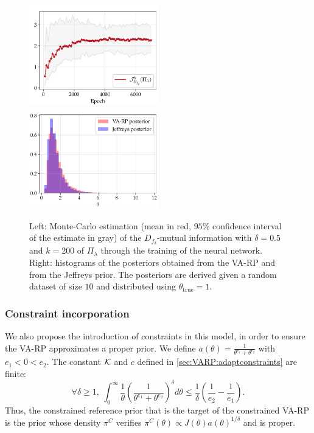 \begin{figure}[h]
    \centering
    \includegraphics[width=5.625cm]{figures/va-rp/MI_normal.pdf}\hspace*{0.2cm}
    \includegraphics[width=5.625cm]{figures/va-rp/normal_post.pdf}
    \caption{Left: Monte-Carlo estimation (mean in red, $95\%$ confidence interval of the estimate in gray) of the $D_{f_\delta}$-mutual information with $\delta=0.5$ and $k=200$ of $\varPi_\lambda$ through the training of the neural network. Right: histograms of the posteriors obtained from the VA-RP and from the Jeffreys prior. The posteriors are derived given a random dataset of size $10$ and distributed using $\theta_{\text{true}}=1$.}
    \label{fig:VARP:normal-noconstr}
\end{figure}




\subsubsection{Constraint incorporation}


We also propose the introduction of constraints in this model, in order to ensure the VA-RP approximates a proper prior. We define $a(\theta)=\frac{1}{\theta^{e_1}+\theta^{e_2}}$ with $e_1<0<e_2$. The constant $\mathcal{K}$ and $c$ defined in \cref{sec:VARP:adaptconstraints} are finite:
\begin{equation}
    \forall\delta\geq1,\ \int_0^\infty\frac{1}{\theta}\left(\frac{1}{\theta^{e_1}+\theta^{e_2}}\right)^\delta d\theta \leq\frac{1}{\delta}\left(\frac{1}{e_2}-\frac{1}{e_1}\right).
\end{equation}
Thus, the constrained reference prior that is the target of the constrained VA-RP is the prior whose density $\pi^C$ verifies $\pi^C(\theta)\propto J(\theta)a(\theta)^{1/\delta}$ and is proper.

